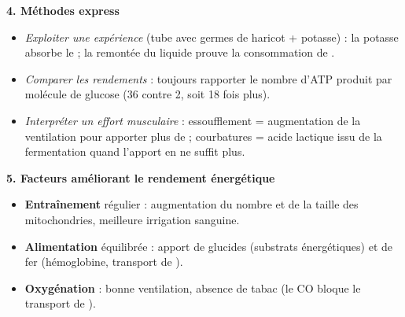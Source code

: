 \documentclass[11pt]{article}
\begin{document}
\begin{bilan}
\textbf{4. Méthodes express}
\begin{itemize}
\item \emph{Exploiter une expérience} (tube avec germes de haricot + potasse) : la potasse absorbe le  ; la remontée du liquide prouve la consommation de .
\item \emph{Comparer les rendements} : toujours rapporter le nombre d'ATP produit par molécule de glucose (36 contre 2, soit 18 fois plus).
\item \emph{Interpréter un effort musculaire} : essoufflement = augmentation de la ventilation pour apporter plus de  ; courbatures = acide lactique issu de la fermentation quand l'apport en  ne suffit plus.
\end{itemize}

\textbf{5. Facteurs améliorant le rendement énergétique}
\begin{itemize}
\item \textbf{Entraînement} régulier : augmentation du nombre et de la taille des mitochondries, meilleure irrigation sanguine.
\item \textbf{Alimentation} équilibrée : apport de glucides (substrats énergétiques) et de fer (hémoglobine, transport de ).
\item \textbf{Oxygénation} : bonne ventilation, absence de tabac (le CO bloque le transport de ).
\end{itemize}
\end{bilan}
\end{document}
